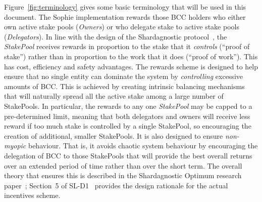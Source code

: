 \documentclass[11pt,a4paper,dvipsnames,twosided,final]{article}
\newcommand{\bcc}{BCC{}}
\newcommand{\bcc}[1]{Bcc}
\begin{document}
Figure~\ref{fig:terminology} gives some basic terminology that will be used in this document.
The Sophie implementation rewards those \bcc{} holders who either own active stake pools
(\emph{Owners}) or who delegate stake to active stake pools (\emph{Delegators}).
In line with the design of the Shardagnostic protocol~\cite{shardagnostic_classic}, the \emph{StakePool} receives
rewards in proportion to the stake that it \emph{controls} (``proof of
stake'') rather than in proportion to the work that it does (``proof of work'').
This has cost, efficiency and safety advantages.
The rewards scheme is designed to help ensure that no single entity can
dominate the system by \emph{controlling} excessive amounts of \bcc{}.  This is achieved by creating intrinsic
balancing mechanisms that will naturally spread all the active stake among a large number of StakePools.
In particular, the rewards to any one \emph{StakePool} may be capped to a pre-determined limit,
meaning that both delegators and owners will receive less reward if too much stake is controlled by a single StakePool,
so encouraging the creation of additional, smaller StakePools.
It is also designed to ensure \emph{non-myopic} behaviour.  That is, it avoids chaotic system behaviour by encouraging the delegation of \bcc{} to those StakePools that will provide
the best overall returns over an extended period of time rather than over the short term.
The overall theory that ensures this is described in the Shardagnostic Optimum research
paper~\cite{shardagnostic_optimum}; Section~5 of SL-D1~\cite{delegation_design} provides the design rationale
for the actual incentives scheme.
\end{document}
